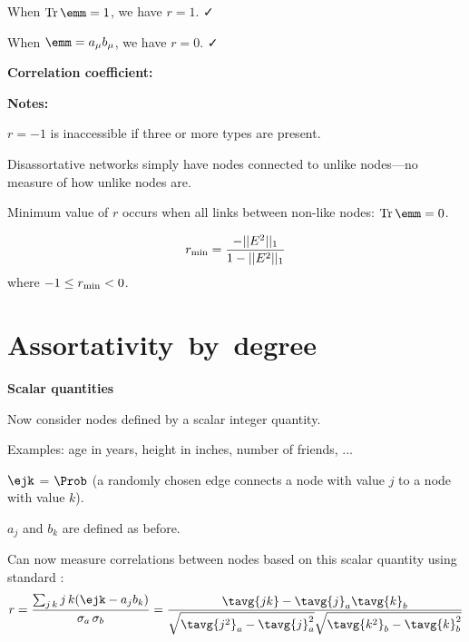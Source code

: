     When $\textnormal{Tr}\, \emm = 1$, we have $r=1$. \alert{\faCheck}
  
    When $\emm = a_{\mu} b_{\mu}$, we have $r=0$. \alert{\faCheck}
  


  \textbf{Correlation coefficient:}

  \textbf{Notes:}
  
  
    $r=-1$ is inaccessible if three or more types are present.
  
    Disassortative networks
    simply have nodes connected to unlike nodes---no measure
    of how unlike nodes are.
  
    Minimum value of $r$ occurs when all links between
    non-like nodes: $\textnormal{Tr}\, \emm = 0$.
  
    $$
    r_{\textnormal{min}}
    =
    \frac{
      - || E^2 ||_1
    }
    {
      1 - || E^2 ||_1
    }
    $$
    where $-1 \le r_{\textnormal{min}} < 0$.
  
  





\section{Assortativity\ by\ degree}

  \textbf{Scalar quantities}

  
  
    Now consider nodes defined by a scalar integer quantity.
  
    Examples: age in years, height in inches, number of friends, ...
  
    $\ejk$ = $\Prob$ (a randomly chosen edge connects a node with
    value $j$ to a node with value $k$).
  
    $a_{j}$ and $b_{k}$ are defined as before.
  
    Can now measure correlations between nodes based 
    on this scalar quantity using standard 
    :
    {
      $$
      r = 
      \frac{\sum_{j\, k} j\, k (\ejk - a_j b_k)}
      {\sigma_a\, \sigma_b}
      =
      \frac{
        \tavg{jk} - \tavg{j}_a\tavg{k}_b
      }
      {
        \sqrt{\tavg{j^2}_a - \tavg{j}_a^2}
        \sqrt{\tavg{k^2}_b - \tavg{k}_b^2}
      }
      $$
      }
    
